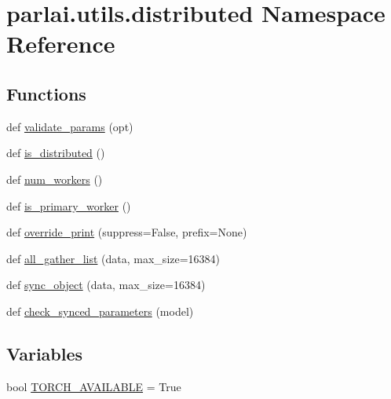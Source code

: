 \hypertarget{namespaceparlai_1_1utils_1_1distributed}{}\section{parlai.\+utils.\+distributed Namespace Reference}
\label{namespaceparlai_1_1utils_1_1distributed}
\subsection*{Functions}
\begin{DoxyCompactItemize}
\item 
def \hyperlink{namespaceparlai_1_1utils_1_1distributed_afd854992e4cc6571b120b9e179cd4a7a}{validate\+\_\+params} (opt)
\item 
def \hyperlink{namespaceparlai_1_1utils_1_1distributed_a023acb5e3b66e1f27e21247c35661279}{is\+\_\+distributed} ()
\item 
def \hyperlink{namespaceparlai_1_1utils_1_1distributed_a99b61b4756577c6542039c238d670dba}{num\+\_\+workers} ()
\item 
def \hyperlink{namespaceparlai_1_1utils_1_1distributed_a9bb1dac198180590ef8c6b6c6f9fc2c4}{is\+\_\+primary\+\_\+worker} ()
\item 
def \hyperlink{namespaceparlai_1_1utils_1_1distributed_a601345e55fc3fc3845c43efa1a04db56}{override\+\_\+print} (suppress=False, prefix=None)
\item 
def \hyperlink{namespaceparlai_1_1utils_1_1distributed_a9ef5bf0debf512ddbeb045327bfd87ef}{all\+\_\+gather\+\_\+list} (data, max\+\_\+size=16384)
\item 
def \hyperlink{namespaceparlai_1_1utils_1_1distributed_a269d3c7284127d9b287b9b61e9161de6}{sync\+\_\+object} (data, max\+\_\+size=16384)
\item 
def \hyperlink{namespaceparlai_1_1utils_1_1distributed_afc64140f9a6437dc1a2b2bd4294ba8ef}{check\+\_\+synced\+\_\+parameters} (model)
\end{DoxyCompactItemize}
\subsection*{Variables}
\begin{DoxyCompactItemize}
\item 
bool \hyperlink{namespaceparlai_1_1utils_1_1distributed_a4383b14f0cb5162d90f1141db981d942}{T\+O\+R\+C\+H\+\_\+\+A\+V\+A\+I\+L\+A\+B\+LE} = True
\end{DoxyCompactItemize}


